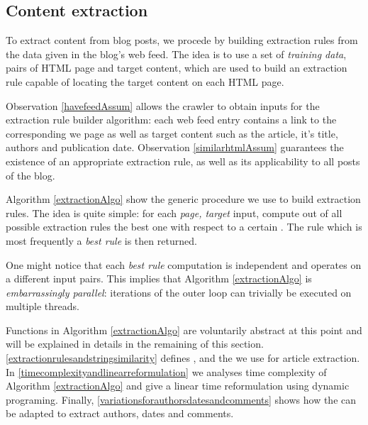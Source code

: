 \subsection{Content extraction}
\label{contentextraction}

To extract content from blog posts, we procede by building extraction rules from the data given in the blog's web feed. The idea is to use a set of \emph{training data}, pairs of HTML page and target content, which are used to build an extraction rule capable of locating the target content on each HTML page.

Observation \ref{havefeedAssum} allows the crawler to obtain inputs for the extraction rule builder algorithm: each web feed entry contains a link to the corresponding we page as well as target content such as the article, it's title, authors and publication date. Observation \ref{similarhtmlAssum} guarantees the existence of an appropriate extraction rule, as well as its applicability to all posts of the blog.

Algorithm \ref{extractionAlgo} show the generic procedure we use to build extraction rules. The idea is quite simple: for each \code{(}\emph{page, target}\code{)} input, compute out of all possible extraction rules the best one with respect to a certain . The rule which is most frequently a \emph{best rule} is then returned.

\extractionAlgo

One might notice that each \emph{best rule} computation is independent and operates on a different input pairs. This implies that Algorithm \ref{extractionAlgo} is \emph{embarrassingly parallel}: iterations of the outer loop can trivially be executed on multiple threads.

Functions in Algorithm \ref{extractionAlgo} are voluntarily abstract at this point and will be explained in details in the remaining of this section. \ref{extractionrulesandstringsimilarity} defines ,  and the  we use for article extraction. In \ref{timecomplexityandlinearreformulation} we analyses time complexity of Algorithm \ref{extractionAlgo} and give a linear time reformulation using dynamic programing. Finally, \ref{variationsforauthorsdatesandcomments} shows how the  can be adapted to extract authors, dates and comments.

